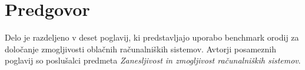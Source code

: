 
\chapter{Predgovor}


Delo je razdeljeno v deset poglavij, ki predstavljajo uporabo benchmark orodij za določanje zmogljivosti oblačnih računalniških sistemov. Avtorji posameznih poglavij so poslušalci predmeta \textit{Zanesljivost in zmogljivost računalniških sistemov}.
